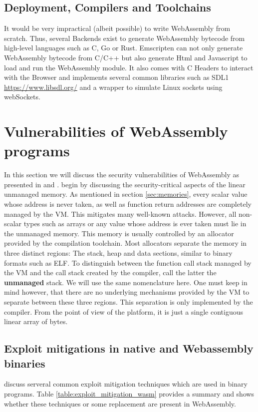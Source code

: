 \documentclass[sigconf]{acmart}
\begin{document}
\subsection{Deployment, Compilers and Toolchains}
It would be very impractical (albeit possible) to write WebAssembly from scratch. Thus, several Backends exist to generate WebAssembly bytecode from high-level languages such as C, Go or Rust. Emscripten can not only generate WebAssembly bytecode from C/C++ but also generate Html and Javascript to load and run the WebAssembly module. It also comes with C Headers to interact with the Browser and implements several common libraries such as SDL1 \url{https://www.libsdl.org/} and a wrapper to simulate Linux sockets using webSockets.  

\section{Vulnerabilities of WebAssembly programs}
\label{sec:binary_vulns}
In this section we will discuss the security vulnerabilities of WebAssembly as presented in \cite{mcfadden_security_2018} and \cite{lehmann_everything_2020}. \cite{lehmann_everything_2020} begin by discussing the security-critical aspects of the linear unmanaged memory. As mentioned in section \ref{sec:memories}, every scalar value whose address is never taken, as well as function return addresses are completely managed by the VM. This mitigates many well-known attacks. However, all non-scalar types such as arrays or any value whose address is ever taken must lie in the unmanaged memory. This memory is usually controlled by an allocator provided by the compilation toolchain. Most allocators separate the memory in three distinct regions: The stack, heap and data sections, similar to binary formats such as ELF. To distinguish between the function call stack managed by the VM and the call stack created by the compiler, \cite{lehmann_everything_2020} call the latter the \textbf{unmanaged} stack. We will use the same nomenclature here. One must keep in mind however, that there are no underlying mechanisms provided by the VM to separate between these three regions. This separation is only implemented by the compiler. From the point of view of the platform, it is just a single contiguous linear array of bytes. 

\subsection{Exploit mitigations in native and Webassembly binaries}
\cite{mcfadden_security_2018} discuss serveral common exploit mitigation techniques which are used in binary programs. Table \ref{table:exploit_mitigation_wasm} provides a summary and shows whether these techniques or some replacement are present in WebAssembly. 
\end{document}
